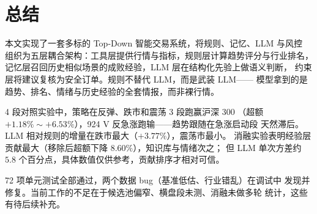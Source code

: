\documentclass[a4paper,11pt]{article}
\begin{document}
\section{总结}

本文实现了一套多标的 Top-Down 智能交易系统，将规则、记忆、LLM 与风控
组织为五层耦合架构：工具层提供行情与指标，规则层计算趋势评分与行业排名，
记忆层召回历史相似场景的成败经验，LLM 层在结构化先验上做语义判断，
约束层将建议复核为安全订单。规则不替代 LLM，而是武装 LLM——
模型拿到的是趋势、排名、情绪与历史经验的全套情报，而非裸行情。

4 段对照实验中，策略在反弹、跌市和震荡 3 段跑赢沪深 300
（超额 $+1.18\% \sim +6.53\%$），924 V 反急涨跑输——趋势跟随在急涨启动段
天然滞后。LLM 相对规则的增量在跌市最大（$+3.77\%$），震荡市最小。
消融实验表明经验层贡献最大（移除后超额下降 $8.60\%$），知识库与情绪次之；
但 LLM 单次方差约 $5.8$ 个百分点，具体数值仅供参考，贡献排序才相对可信。

72 项单元测试全部通过，两个数据 bug（基准低估、行业错乱）在调试中
发现并修复。当前工作的不足在于候选池偏窄、横盘段未测、消融未做多轮
统计，这些有待后续补充。
\end{document}
